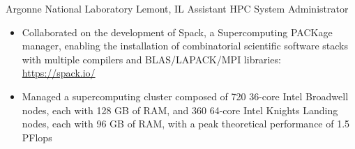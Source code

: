 
        {Argonne National Laboratory}
        {Lemont, IL}
        {Assistant HPC System Administrator}
        {}{
    \begin{itemize}
        \item Collaborated on the development of Spack, a Supercomputing PACKage manager, enabling the installation of combinatorial scientific software stacks with multiple compilers and BLAS/LAPACK/MPI libraries: \url{https://spack.io/}
        \item Managed a supercomputing cluster composed of 720 36-core Intel Broadwell nodes, each with 128 GB of RAM, and 360 64-core Intel Knights Landing nodes, each with 96 GB of RAM, with a peak theoretical performance of 1.5 PFlops
    \end{itemize}
}
